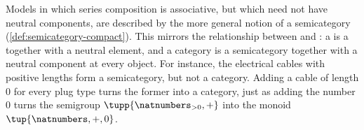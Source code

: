 Models in which series composition is associative, but which need not have neutral components, are described by the more general notion of a semicategory (\cref{def:semicategory-compact}). This mirrors the relationship between  and : a  is a  together with a neutral element, and a category is a semicategory together with a neutral component at every object. For instance, the electrical cables with positive lengths form a semicategory, but not a category. Adding a cable of length $0$ for every plug type turns the former into a category, just as adding the number $0$ turns the semigroup $\tupp{\natnumbers_{>0},+}$ into the monoid $\tup{\natnumbers, +, 0}$.
